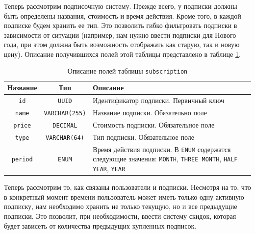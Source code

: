 \documentclass[a4paper,14pt]{extarticle}
\begin{document}
Теперь рассмотрим подписочную систему. Прежде всего, у подписки должны быть определены названия, стоимость и время действия. Кроме того, в каждой подписке будем хранить ее тип. Это позволить гибко фильтровать подписки в зависимости от ситуации (например, нам нужно ввести подписки для Нового года, при этом должна быть возможность отображать как старую, так и новую цену). Описание получившихся полей этой таблицы представлено в таблице \ref{tab:subscription}.

\begin{center}
    \begin{longtable}{|c|c|>{\centering\arraybackslash}m{9.8cm}|}
        \caption{Описание полей таблицы \texttt{subscription}}
        \label{tab:subscription}
        \\
        \hline
        \textbf{Название} & \textbf{Тип}          & \textbf{Описание}                                                                                                                               \\
        \hline
        \texttt{id}       & \texttt{UUID}         & Идентификатор подписки. Первичный ключ                                                                                                          \\
        \hline
        \texttt{name}     & \texttt{VARCHAR(255)} & Название подписки. Обязательно поле                                                                                                             \\
        \hline
        \texttt{price}    & \texttt{DECIMAL}      & Стоимость подписки. Обязательное поле                                                                                                           \\
        \hline
        \texttt{type}     & \texttt{VARCHAR(64)}  & Тип подписки. Обязательное поле                                                                                                                 \\
        \hline
        \texttt{period}   & \texttt{ENUM}         & Время действия подписки. В \texttt{ENUM} содержатся следующие значения: \texttt{MONTH}, \texttt{THREE MONTH}, \texttt{HALF YEAR}, \texttt{YEAR} \\
        \hline
    \end{longtable}
\end{center}

Теперь рассмотрим то, как связаны пользователи и подписки. Несмотря на то, что в конкретный момент времени пользователь может иметь только одну активную подписку, нам необходимо хранить не только текущую, но и все предыдущие подписки. Это позволит, при необходимости, ввести систему скидок, которая будет зависеть от количества предыдущих купленных подписок.
\end{document}
